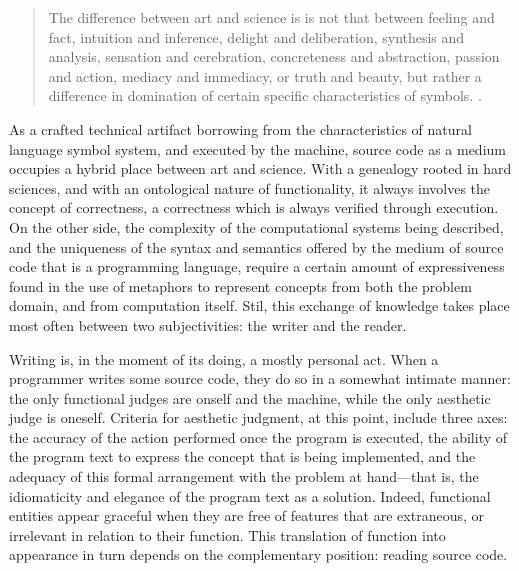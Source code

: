 \begin{quote}
  The difference between art and science is is not that between feeling and fact, intuition and inference, delight and deliberation, synthesis and analysis, sensation and cerebration, concreteness and abstraction, passion and action, mediacy and immediacy, or truth and beauty, but rather a difference in domination of certain specific characteristics of symbols. \citep{goodman_languages_1976}.
\end{quote}

As a crafted technical artifact borrowing from the characteristics of natural language symbol system, and executed by the machine, source code as a medium occupies a hybrid place between art and science. With a genealogy rooted in hard sciences, and with an ontological nature of functionality, it always involves the concept of correctness, a correctness which is always verified through execution. On the other side, the complexity of the computational systems being described, and the uniqueness of the syntax and semantics offered by the medium of source code that is a programming language, require a certain amount of expressiveness found in the use of metaphors to represent concepts from both the problem domain, and from computation itself. Stil, this exchange of knowledge takes place most often between two subjectivities: the writer and the reader.

Writing is, in the moment of its doing, a mostly personal act. When a programmer writes some source code, they do so in a somewhat intimate manner: the only functional judges are onself and the machine, while the only aesthetic judge is oneself. Criteria for aesthetic judgment, at this point, include three axes: the accuracy of the action performed once the program is executed, the ability of the program text to express the concept that is being implemented, and the adequacy of this formal arrangement with the problem at hand—that is, the idiomaticity and elegance of the program text as a solution. Indeed, functional entities appear graceful when they are free of features that are extraneous, or irrelevant in relation to their function. This translation of function into appearance in turn depends on the complementary position: reading source code.

